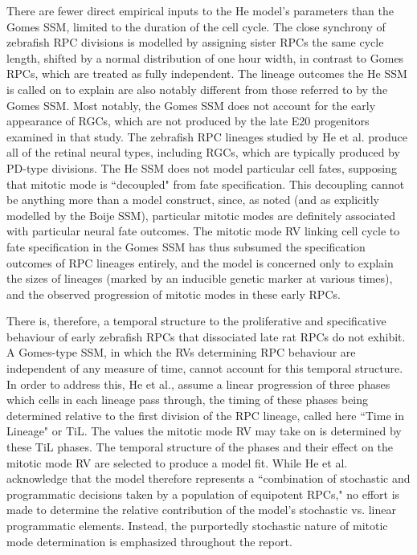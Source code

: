 \documentclass[10pt,letterpaper]{article}
\begin{document}
There are fewer direct empirical inputs to the He model's parameters than the Gomes SSM, limited to the duration of the cell cycle. The close synchrony of zebrafish RPC divisions is modelled by assigning sister RPCs the same cycle length, shifted by a normal distribution of one hour width, in contrast to Gomes RPCs, which are treated as fully independent. The lineage outcomes the He SSM is called on to explain are also notably different from those referred to by the Gomes SSM. Most notably, the Gomes SSM does not account for the early appearance of RGCs, which are not produced by the late E20 progenitors examined in that study. The zebrafish RPC lineages studied by He et al. produce all of the retinal neural types, including RGCs, which are typically produced by PD-type divisions. The He SSM does not model particular cell fates, supposing that mitotic mode is ``decoupled" from fate specification. This decoupling cannot be anything more than a model construct, since, as noted (and as explicitly modelled by the Boije SSM), particular mitotic modes are definitely associated with particular neural fate outcomes. The mitotic mode RV linking cell cycle to fate specification in the Gomes SSM has thus subsumed the specification outcomes of RPC lineages entirely, and the model is concerned only to explain the sizes of lineages (marked by an inducible genetic marker at various times), and the observed progression of mitotic modes in these early RPCs.

There is, therefore, a temporal structure to the proliferative and specificative behaviour of early zebrafish RPCs that dissociated late rat RPCs do not exhibit. A Gomes-type SSM, in which the RVs determining RPC behaviour are independent of any measure of time, cannot account for this temporal structure. In order to address this, He et al., assume a linear progression of three phases which cells in each lineage pass through, the timing of these phases being determined relative to the first division of the RPC lineage, called here ``Time in Lineage" or TiL. The values the mitotic mode RV may take on is determined by these TiL phases. The temporal structure of the phases and their effect on the mitotic mode RV are selected to produce a model fit. While He et al. acknowledge that the model therefore represents a ``combination of stochastic and programmatic decisions taken by a population of equipotent RPCs," no effort is made to determine the relative contribution of the model's stochastic vs. linear programmatic elements. Instead, the purportedly stochastic nature of mitotic mode determination is emphasized throughout the report.
\end{document}
